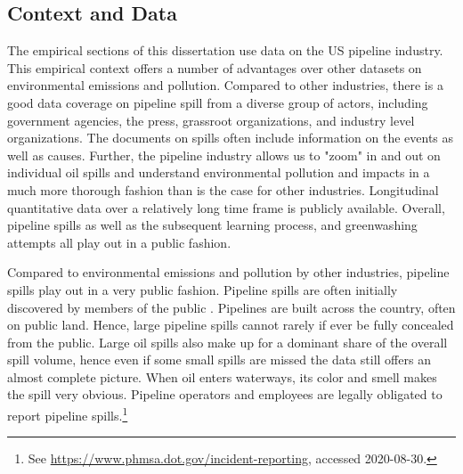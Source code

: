 \subsection{Context and Data}

The empirical sections of this dissertation use data on the US pipeline industry. This empirical context offers a number of advantages over other datasets on environmental emissions and pollution. Compared to other industries, there is a good data coverage on pipeline spill from a diverse group of actors, including government agencies, the press, grassroot organizations, and industry level organizations. The documents on spills often include information on the events as well as causes. Further, the pipeline industry allows us to "zoom" in and out on individual oil spills and understand environmental pollution and impacts in a much more thorough fashion than is the case for other industries. Longitudinal quantitative data over a relatively long time frame is publicly available. Overall, pipeline spills as well as the subsequent learning process, and greenwashing attempts all play out in a public fashion.

Compared to environmental emissions and pollution by other industries, pipeline spills play out in a very public fashion. Pipeline spills are often initially discovered by members of the public \citep[p. 3-39]{Shaw2012}. Pipelines are built across the country, often on public land. Hence, large pipeline spills cannot rarely if ever be fully concealed from the public. Large oil spills also make up for a dominant share of the overall spill volume, hence even if some small spills are missed the data still offers an almost complete picture. When oil enters waterways, its color and smell makes the spill very obvious. Pipeline operators and employees are legally obligated to report pipeline spills.\footnote{See \url{https://www.phmsa.dot.gov/incident-reporting}, accessed 2020-08-30.} 

